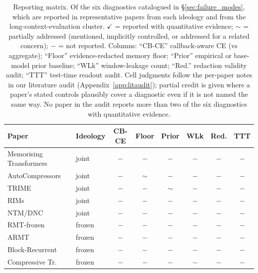 \documentclass{article}
\begin{document}
\begin{table}[t]
\centering
\caption{Reporting matrix.  Of the six diagnostics catalogued in
\S\ref{sec:failure_modes}, which are reported in representative
papers from each ideology and from the long-context-evaluation
cluster.  $\checkmark$ = reported with quantitative evidence;
$\sim$ = partially addressed (mentioned, implicitly controlled, or
addressed for a related concern); $-$ = not reported.  Columns:
``CB-CE'' callback-aware CE (vs aggregate); ``Floor''
evidence-redacted memory floor; ``Prior'' empirical or base-model
prior baseline; ``WLk'' window-leakage count; ``Red.'' redaction
validity audit; ``TTT'' test-time readout audit.  Cell judgments
follow the per-paper notes in our literature audit
(Appendix~\ref{app:litaudit}); partial credit is given where a
paper's stated controls plausibly cover a diagnostic even if it is
not named the same way.  No paper in the audit reports more than
two of the six diagnostics with quantitative evidence.}
\label{tab:ideologies}
\small
\begin{tabular}{llcccccc}
\toprule
Paper & Ideology & CB-CE & Floor & Prior & WLk & Red. & TTT \\
\midrule
Memorising Transformers~\cite{memorizing2022}     & joint     & $-$    & $-$    & $-$           & $-$           & $-$ & $-$    \\
AutoCompressors~\cite{autocompressors2023}        & joint     & $-$    & $\sim$ & $-$           & $-$           & $-$ & $-$    \\
TRIME~\cite{trime2022}                             & joint     & $-$    & $-$    & $\sim$        & $-$           & $-$ & $-$    \\
RIMs~\cite{rims2021}                               & joint     & $-$    & $-$    & $-$           & $-$           & $-$ & $-$    \\
NTM/DNC~\cite{ntm2014}                             & joint     & $-$    & $-$    & $-$           & $-$           & $-$ & $-$    \\
RMT-frozen~\cite{rmt2022}                          & frozen    & $-$    & $-$    & $-$           & $-$           & $-$ & $-$    \\
ARMT~\cite{armt2024}                               & frozen    & $-$    & $-$    & $-$           & $-$           & $-$ & $-$    \\
Block-Recurrent~\cite{blockrecurrent2022}         & frozen    & $-$    & $-$    & $-$           & $-$           & $-$ & $-$    \\
Compressive Tr.~\cite{compressive2019}             & frozen    & $-$    & $-$    & $-$           & $-$           & $-$ & $-$    \\

\end{tabular}
\end{table}
\end{document}
